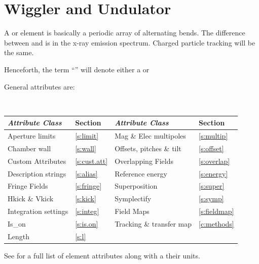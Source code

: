 {\newpage

\section{Wiggler and Undulator} 
\label{s:wiggler}

A  or  element is basically a periodic array of alternating bends.
The difference between  and  is in the x-ray emission spectrum.
Charged particle tracking will be the same. 

Henceforth, the term ``'' will denote either a  or 

General  attributes are:
\begin{center}
\tt
\begin{tabular}{llll} \toprule
  {\sl Attribute Class}      & Section           & {\sl Attribute Class}      & Section            \\ \midrule
  Aperture limits            & \ref{s:limit}     & Mag \& Elec multipoles     & \ref{s:multip}     \\
  Chamber wall               & \ref{s:wall}      & Offsets, pitches \& tilt   & \ref{s:offset}     \\
  Custom Attributes          & \ref{s:cust.att}  & Overlapping Fields         & \ref{s:overlap}    \\
  Description strings        & \ref{s:alias}     & Reference energy           & \ref{s:energy}     \\ 
  Fringe Fields              & \ref{s:fringe}    & Superposition              & \ref{s:super}      \\
  Hkick \& Vkick             & \ref{s:kick}      & Symplectify                & \ref{s:symp}       \\
  Integration settings       & \ref{s:integ}     & Field Maps                 & \ref{s:fieldmap}   \\
  Is_on                      & \ref{s:is.on}     & Tracking \& transfer map   & \ref{c:methods}    \\ 
  Length                     & \ref{s:l}         &                            &                    \\ 
  \bottomrule
\end{tabular}
\end{center}
\toffset
See  for a full list of element attributes along with a their units.

}
